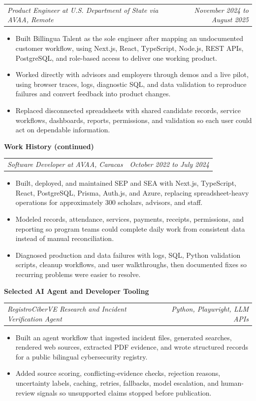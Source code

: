 \documentclass[10pt,letterpaper]{article}
\makeatletter
\newcommand{\bodyfont}{\fontsize{10.5}{15.75}\selectfont}
\newcommand{\sectiontitle}[1]{%
  \vspace{4pt}
  {\bodyfont\textbf{#1}}\par
  \nopagebreak[4]
  \vspace{2pt}
}
\newcommand{\roleline}[2]{%
  \begin{tabularx}{\textwidth}{@{}Xr@{}}
    \bodyfont\textit{#1} & \bodyfont\textit{#2}
  \end{tabularx}
  \nopagebreak[4]
  \vspace{1pt}
}
\makeatother
\begin{document}
\vspace{3pt}
\roleline{Product Engineer at U.S. Department of State via AVAA, Remote}{November 2024 to August 2025}
\begin{itemize}
  \item Built Billingua Talent as the sole engineer after mapping an undocumented customer workflow, using Next.js, React, TypeScript, Node.js, REST APIs, PostgreSQL, and role-based access to deliver one working product.
  \item Worked directly with advisors and employers through demos and a live pilot, using browser traces, logs, diagnostic SQL, and data validation to reproduce failures and convert feedback into product changes.
  \item Replaced disconnected spreadsheets with shared candidate records, service workflows, dashboards, reports, permissions, and validation so each user could act on dependable information.
\end{itemize}

\newpage
\sectiontitle{Work History (continued)}

\roleline{Software Developer at AVAA, Caracas}{October 2022 to July 2024}
\begin{itemize}
  \item Built, deployed, and maintained SEP and SEA with Next.js, TypeScript, React, PostgreSQL, Prisma, Auth.js, and Azure, replacing spreadsheet-heavy operations for approximately 300 scholars, advisors, and staff.
  \item Modeled records, attendance, services, payments, receipts, permissions, and reporting so program teams could complete daily work from consistent data instead of manual reconciliation.
  \item Diagnosed production and data failures with logs, SQL, Python validation scripts, cleanup workflows, and user walkthroughs, then documented fixes so recurring problems were easier to resolve.
\end{itemize}

\sectiontitle{Selected AI Agent and Developer Tooling}

\roleline{RegistroCiberVE Research and Incident Verification Agent}{Python, Playwright, LLM APIs}
\begin{itemize}
  \item Built an agent workflow that ingested incident files, generated searches, rendered web sources, extracted PDF evidence, and wrote structured records for a public bilingual cybersecurity registry.
  \item Added source scoring, conflicting-evidence checks, rejection reasons, uncertainty labels, caching, retries, fallbacks, model escalation, and human-review signals so unsupported claims stopped before publication.
\end{itemize}
\end{document}
